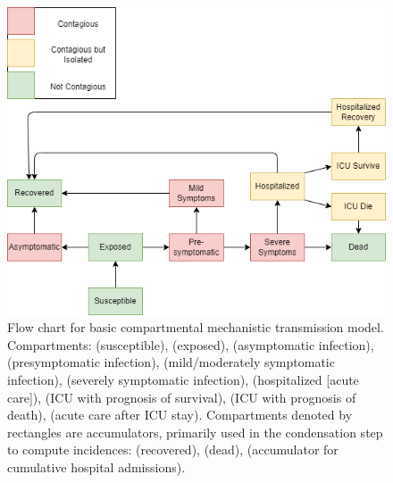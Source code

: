 \documentclass[12pt]{article}\usepackage[]{graphicx}\usepackage[]{color}
\begin{document}
\begin{figure}
\includegraphics[width=\maxwidth]{pix/Macpan_Base_Epi-model.png}
\caption{Flow chart for basic compartmental mechanistic transmission model. 
Compartments:  (susceptible),  (exposed),  (asymptomatic infection),  (presymptomatic infection),  (mild/moderately symptomatic infection),  (severely symptomatic infection),  (hospitalized [acute care]),  (ICU with prognosis of survival),  (ICU with prognosis of death),  (acute care after ICU stay). 
Compartments denoted by rectangles are accumulators, primarily used in the condensation step to compute incidences:  (recovered),  (dead),  (accumulator for cumulative hospital admissions).
}
\label{fig:flowchart}
\end{figure}


\end{document}
